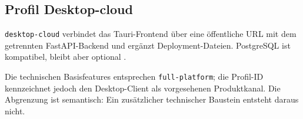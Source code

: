 \subsection{Profil Desktop-cloud}
\label{subsec:profil-desktop-cloud}

\texttt{desktop-cloud} verbindet das Tauri-Frontend über eine öffentliche URL
mit dem getrennten FastAPI-Backend und ergänzt Deployment-Dateien. PostgreSQL
ist kompatibel, bleibt aber optional
\parencite{kleiveist2026profiles,kleiveist2026deployment}.

Die technischen Basisfeatures entsprechen \texttt{full-platform}; die
Profil-ID kennzeichnet jedoch den Desktop-Client als vorgesehenen Produktkanal.
Die Abgrenzung ist semantisch: Ein zusätzlicher technischer Baustein entsteht
daraus nicht.
